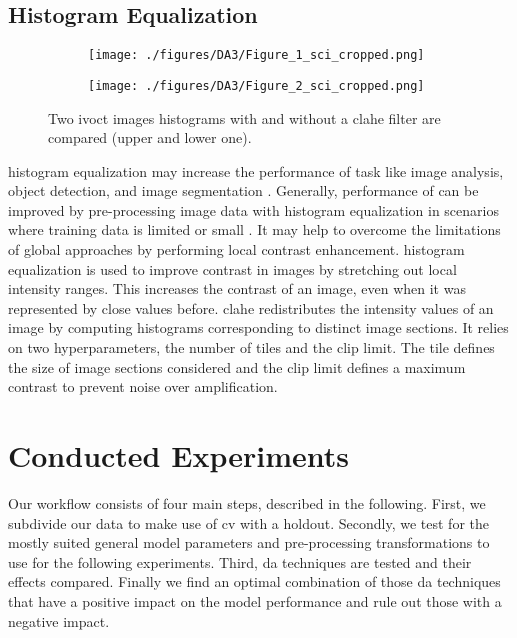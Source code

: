 \subsection{Histogram Equalization}

\begin{figure}
    \centering
    \begin{subfigure}{1\textwidth}
    \texttt{[image: ./figures/DA3/Figure\_1\_sci\_cropped.png]}
    \end{subfigure}
    \begin{subfigure}{1\textwidth}
    \texttt{[image: ./figures/DA3/Figure\_2\_sci\_cropped.png]}
    \end{subfigure}
    \caption[\Acrshort{clahe} \gls{histogram} equalization]{Two \acrshort{ivoct} images \glspl{histogram} with and without a \acrshort{clahe} filter are compared (upper and lower one).}
    \label{fig:histograms}
\end{figure}

\Gls{histogram} equalization may increase the performance of task like image analysis, object detection, and image segmentation \cite{Campos.2019}. Generally, performance of  can be improved by pre-processing image data with \gls{histogram} equalization in scenarios where training data is limited or small \cite{Mahmood.2018}. It may help to overcome the limitations of global approaches by performing local contrast enhancement. \Gls{histogram} equalization is used to improve contrast in images by stretching out local intensity ranges. This increases the contrast of an image, even when it was represented by close values before. \Acrfull{clahe} redistributes the intensity values of an image by computing histograms corresponding to distinct image sections. It relies on two hyperparameters, the number of tiles and the clip limit. The tile defines the size of image sections considered and the clip limit defines a maximum contrast to prevent noise over amplification.

\section{Conducted Experiments}

Our workflow consists of four main steps, described in the following. First, we subdivide our data to make use of \acrshort{cv} with a holdout. Secondly, we test for the mostly suited general model parameters and pre-processing transformations to use for the following experiments. Third, \acrshort{da} techniques are tested and their effects compared. Finally we find an optimal combination of those \acrshort{da} techniques that have a positive impact on the model performance and rule out those with a negative impact.

